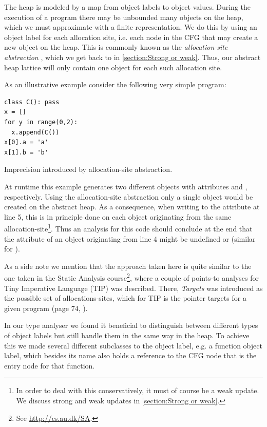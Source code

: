 The heap is modeled by a map from object labels to object values. During the execution of a program there may be unbounded many objects on the heap, which we must approximate with a finite representation. We do this by using an object label for each allocation site, i.e. each node in the CFG that may create a new object on the heap. This is commonly known as the \textit{allocation-site abstraction} \cite{recency,aopas}, which we get back to in \autoref{section:Strong or weak}. Thus, our abstract heap lattice will only contain one object for each such allocation site.

As an illustrative example consider the following very simple program:

\begin{listing}[H]
	\begin{verbatim}
class C(): pass
x = []
for y in range(0,2):
  x.append(C())
x[0].a = 'a'
x[1].b = 'b'
	\end{verbatim}
	\caption{Imprecision introduced by allocation-site abstraction.}
\end{listing}

At runtime this example generates two different  objects with attributes  and , respectively. Using the allocation-site abstraction only a single  object would be created on the abstract heap. As a consequence, when writing to the attribute  at line 5, this is in principle done on each object originating from the same allocation-site\footnote{In order to deal with this conservatively, it must of course be a weak update. We discuss strong and weak updates in \autoref{section:Strong or weak}.}. Thus an analysis for this code should conclude at the end that the attribute  of an object originating from line 4 might be undefined or  (similar for ).

As a side note we mention that the approach taken here is quite similar to the one taken in the Static Analysis course\footnote{See \url{http://cs.au.dk/SA}.}, where a couple of points-to analyses for Tiny Imperative Language (TIP) was described. There, \textit{Targets} was introduced as the possible set of allocations-sites, which for TIP is the pointer targets  for a given program (page 74, \cite{sa}).

In our type analyser we found it beneficial to distinguish between different types of object labels but still handle them in the same way in the heap. To achieve this we made several different subclasses to the object label, e.g. a function object label, which besides its name also holds a reference to the CFG node that is the entry node for that function.


